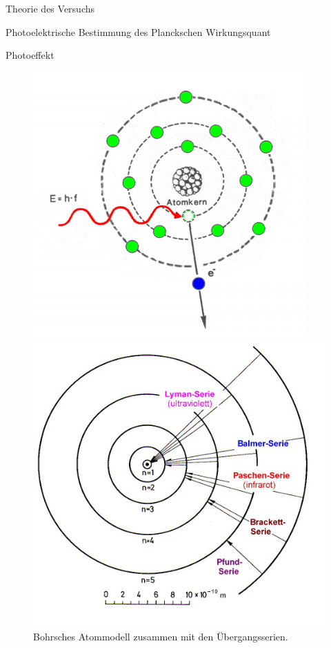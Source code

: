 \documentclass[pdftex, a4paper,11pt, twoside, ngerman]{report}
\begin{document}
\begin{chapter}{Theorie des Versuchs}
\begin{section}{Photoelektrische Bestimmung des Planckschen Wirkungsquant}
\begin{subsection}{Photoeffekt}
        \begin{figure}[htbp]
          \centering
          \begin{minipage}{0.48\textwidth}
            \centering
            \includegraphics[width=.9\textwidth]{Figures/photoeffekt.png}
            \caption{Schematische Darstellung der Wirkungsweise des
                Photoeffekts.\cite{bib:Photoeffekt}}
            \label{fig:Photoeffekt}
          \end{minipage}\quad
          \begin{minipage}{0.48\textwidth}
            \centering
            \includegraphics[width=.9\textwidth]
                {Figures/BohrschesAtommodellSerien.png}
            \caption{Bohrsches Atommodell zusammen mit den Übergangsserien.
                \cite{bib:BohrschesAtommodellSerien}}
            \label{fig:BohrschesAtommodellSerien}
          \end{minipage}
        \end{figure}
       

\end{subsection}
\end{section}
\end{chapter}
\end{document}
